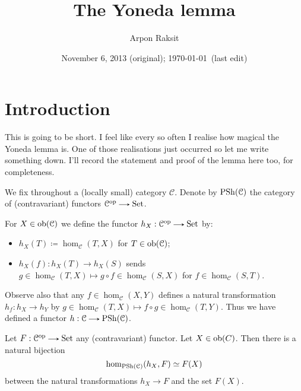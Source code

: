 


\title{The Yoneda lemma}
\author{Arpon Raksit}
\date{November 6, 2013 (original); \today\ (last edit)}


\maketitle
\thispagestyle{fancy}


\renewcommand{\C}{\mathcal{C}}

\section{Introduction}

This is going to be short. I feel like every so often I realise how
magical the Yoneda lemma is. One of those realisations just occurred
so let me write something down. I'll record the statement and proof of
the lemma here too, for completeness.

\begin{notation}
  We fix throughout a (locally small) category $\C$. Denote by
  $\PSh(\C)$ the category of (contravariant) functors $\C^{\op} \to
  \Set$.
\end{notation}

\begin{definition}
  For $X \in \ob(\C)$ we define the functor $h_X : \C^{\op} \to \Set$
  by:
  \begin{itemize}
  \item $h_X(T) \coloneqq \hom_\C(T,X)$ for $T \in \ob(\C)$;
  \item $h_X(f) : h_X(T) \to h_X(S)$ sends $g \in \hom_\C(T,X) \mapsto
    g \circ f \in \hom_\C(S,X)$ for $f \in \hom_\C(S,T)$.
  \end{itemize}
  Observe also that any $f \in \hom_\C(X,Y)$ defines a natural
  transformation $h_f : h_X \to h_Y$ by $g \in \hom_\C(T,X) \mapsto f
  \circ g \in \hom_\C(T,Y)$. Thus we have defined a functor $h : \C
  \to \PSh(\C)$.
\end{definition}

\begin{lemma}[Yoneda]
  Let $F : \C^{\op} \to \Set$ any (contravariant) functor. Let $X \in
  \operatorname{ob}(C)$. Then there is a natural bijection
  \[
  \hom_{\PSh(\C)}(h_X,F) \simeq F(X)
  \]
  between the natural transformations $h_X \to F$ and the set $F(X)$.
\end{lemma}

